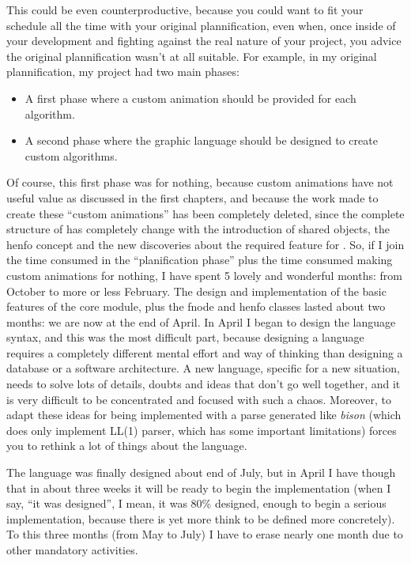 \documentclass{article}
\begin{document}
This could be even counterproductive, because you could want to fit your
schedule all the time with your original plannification, even when, once inside
of your development and fighting against the real nature of your project, you
advice the original plannification wasn't at all suitable. For example, in my
original plannification, my project had two main phases:

\begin{itemize}
\item A first phase where a custom animation should be provided for each algorithm.
\item A second phase where the graphic language should be designed to create
  custom algorithms.
\end{itemize}

Of course, this first phase was for nothing, because custom animations have not
useful value as discussed in the first chapters, and because the work made to
create these ``custom animations'' has been completely deleted, since the
complete structure of \fav has completely change with the introduction of shared
objects, the henfo concept and the new discoveries about the required feature
for \faupp. So, if I join the time consumed in the ``planification phase'' plus
the time consumed making custom animations for nothing, I have spent 5 lovely
and wonderful months: from October to more or less February. The design and
implementation of the basic features of the core module, plus the fnode and
henfo classes lasted about two months: we are now at the end of April. In April
I began to design the language syntax, and this was the most difficult part,
because designing a language requires a completely different mental effort and
way of thinking than designing a database or a software architecture. A new
language, specific for a new situation, needs to solve lots of details, doubts
and ideas that don't go well together, and it is very difficult to be
concentrated and focused with such a chaos. Moreover, to adapt these ideas for
being implemented with a parse generated like \textit{bison} (which does only
implement LL(1) parser, which has some important limitations) forces you to
rethink a lot of things about the language.

The language was finally designed about end of July, but in April I have
though that in about three weeks it will be ready to begin the implementation
(when I say, ``it was designed'', I mean, it was 80\% designed, enough to begin
a serious implementation, because there is yet more think to be defined more
concretely). To this three months (from May to July) I have to erase nearly one
month due to other mandatory activities.
\end{document}
